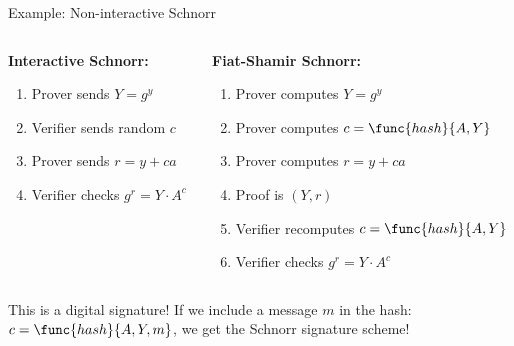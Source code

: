 \documentclass[aspectratio=169, lualatex, handout]{beamer}
\begin{document}
\begin{frame}{Example: Non-interactive Schnorr}
	\begin{columns}[c]
		\begin{column}{0.5\textwidth}
			\textbf{Interactive Schnorr:}
			\begin{enumerate}
				\item Prover sends $Y = g^y$
				\item Verifier sends random $c$
				\item Prover sends $r = y + ca$
				\item Verifier checks $g^r = Y \cdot A^c$
			\end{enumerate}
		\end{column}
		\begin{column}{0.5\textwidth}
			\textbf{Fiat-Shamir Schnorr:}
			\begin{enumerate}
				\item Prover computes $Y = g^y$
				\item Prover computes $c = \func{hash}{A, Y}$
				\item Prover computes $r = y + ca$
				\item Proof is $(Y, r)$
				\item Verifier recomputes $c = \func{hash}{A, Y}$
				\item Verifier checks $g^r = Y \cdot A^c$
			\end{enumerate}
		\end{column}
	\end{columns}
	\vspace{0.5em}
	\begin{alertblock}{This is a digital signature!}
		If we include a message $m$ in the hash: $c = \func{hash}{A, Y, m}$, we get the Schnorr signature scheme!
	\end{alertblock}
\end{frame}
\end{document}
